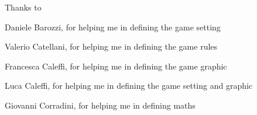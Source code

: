 \ringraziamenti
Thanks to

Daniele Barozzi, for helping me in defining the game setting

Valerio Catellani, for helping me in defining the game rules

Francesca Caleffi, for helping me in defining the game graphic

Luca Caleffi, for helping me in defining the game setting and graphic

Giovanni Corradini, for helping me in defining maths